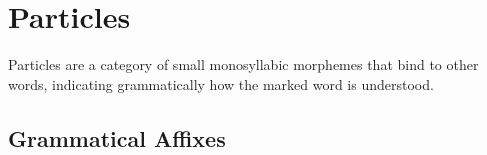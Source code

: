 \section{Particles}
Particles are a category of small monosyllabic morphemes that bind to other words, indicating grammatically how the marked word is understood.

\subsection{Grammatical Affixes}

